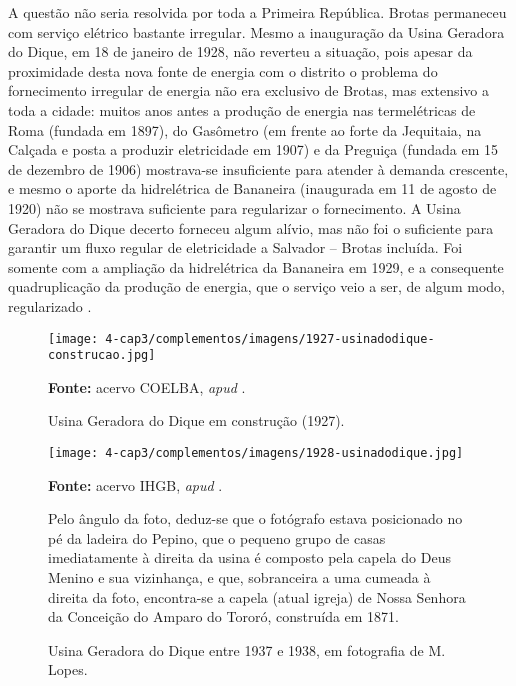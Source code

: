 A questão não seria resolvida por toda a Primeira República. Brotas permaneceu com serviço elétrico bastante irregular. Mesmo a inauguração da Usina Geradora do Dique, em 18 de janeiro de 1928, não reverteu a situação, pois apesar da proximidade desta nova fonte de energia com o distrito o problema do fornecimento irregular de energia não era exclusivo de Brotas, mas extensivo a toda a cidade: muitos anos antes a produção de energia nas termelétricas de Roma (fundada em 1897), do Gasômetro (em frente ao forte da Jequitaia, na Calçada e posta a produzir eletricidade em 1907) e da Preguiça (fundada em 15 de dezembro de 1906) mostrava-se insuficiente para atender à demanda crescente, e mesmo o aporte da hidrelétrica de Bananeira (inaugurada em 11 de agosto de 1920) não se mostrava suficiente para regularizar o fornecimento. A Usina Geradora do Dique decerto forneceu algum alívio, mas não foi o suficiente para garantir um fluxo regular de eletricidade a Salvador -- Brotas incluída. Foi somente com a ampliação da hidrelétrica da Bananeira em 1929, e a consequente quadruplicação da produção de energia, que o serviço veio a ser, de algum modo, regularizado \cite{reboucas_eletricidade_2018}.

\begin{figure}[!htp]
\centering
\caption{Usina Geradora do Dique em construção (1927).}
\texttt{[image: 4-cap3/complementos/imagens/1927-usinadodique-construcao.jpg]}{\par \footnotesize \textbf{Fonte:} acervo COELBA, \textit{apud} .}
\label{fig:usinadiqueconstrucao}
\end{figure}

\begin{figure}[!htp]
\centering
\caption{Usina Geradora do Dique entre 1937 e 1938, em fotografia de M. Lopes.}
\texttt{[image: 4-cap3/complementos/imagens/1928-usinadodique.jpg]}{\par \footnotesize \textbf{Fonte:} acervo IHGB, \textit{apud} . \par Pelo ângulo da foto, deduz-se que o fotógrafo estava posicionado no pé da ladeira do Pepino, que o pequeno grupo de casas imediatamente à direita da usina é composto pela capela do Deus Menino e sua vizinhança, e que, sobranceira a uma cumeada à direita da foto, encontra-se a capela (atual igreja) de Nossa Senhora da Conceição do Amparo do Tororó, construída em 1871.}
\label{fig:usinadique}
\end{figure}

